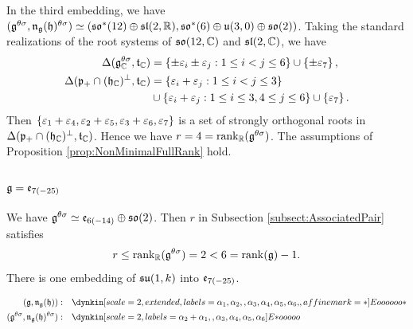 In the third embedding, we have $(\mathfrak{g}^{\theta\sigma}, \mathfrak{n}_{\mathfrak{g}}(\mathfrak{h})^{\theta\sigma}) \simeq (\mathfrak{so}^*(12) \oplus \mathfrak{sl}(2,\mathbb{R}), \mathfrak{so}^*(6) \oplus \mathfrak{u}(3, 0) \oplus\mathfrak{so}(2))$.
Taking the standard realizations of the root systems of $\mathfrak{so}(12,\mathbb{C})$ and $\mathfrak{sl}(2,\mathbb{C})$, we have
\begin{align*}
	\Delta(\mathfrak{g}_{\mathbb{C}}^{\theta\sigma}, \mathfrak{t}_{\mathbb{C}}) &= \left\{\pm \varepsilon_i \pm \varepsilon_j: 1\leq i < j \leq 6 \right\} \cup \left\{\pm \varepsilon_7 \right\}, \\
	\Delta(\mathfrak{p}_+ \cap (\mathfrak{h}_{\mathbb{C}})^\perp, \mathfrak{t}_{\mathbb{C}}) &= \left\{\varepsilon_i + \varepsilon_j: 1\leq i < j \leq 3 \right\} \\
	&\cup \left\{\varepsilon_i + \varepsilon_j: 1\leq i \leq 3, 4\leq j \leq 6 \right\} \cup \left\{\varepsilon_7 \right\}.
\end{align*}
Then $\left\{\varepsilon_1 + \varepsilon_4, \varepsilon_2 + \varepsilon_5, \varepsilon_3 + \varepsilon_6, \varepsilon_7 \right\}$ is a set of strongly orthogonal roots in $\Delta(\mathfrak{p}_+ \cap (\mathfrak{h}_{\mathbb{C}})^\perp, \mathfrak{t}_{\mathbb{C}})$.
Hence we have $r = 4 = \operatorname{rank}_{\mathbb{R}}(\mathfrak{g}^{\theta\sigma})$.
The assumptions of Proposition \ref{prop:NonMinimalFullRank} hold.

\subsubsection{\texorpdfstring{$\mathfrak{g} = \mathfrak{e}_{7(-25)}$}{g=e7(-25)}}


We have $\mathfrak{g}^{\theta\sigma} \simeq \mathfrak{e}_{6(-14)} \oplus \mathfrak{so}(2)$.
Then $r$ in Subsection \ref{subsect:AssociatedPair} satisfies
\begin{align*}
	r \leq \operatorname{rank}_{\mathbb{R}}(\mathfrak{g}^{\theta\sigma}) = 2 < 6 = \operatorname{rank}(\mathfrak{g}) - 1.
\end{align*}
There is one embedding of $\mathfrak{su}(1, k)$ into $\mathfrak{e}_{7(-25)}$.

\begin{align*}
	(\lie{g}, \lieNorm_{\lie{g}}(\lie{h})): \quad & \dynkin[scale=2, extended, labels={\alpha_1, \alpha_2, , \alpha_3, \alpha_4, \alpha_5, \alpha_6, }, affine mark=*]{E}{oooooo*} \\
	(\lie{g}^{\theta\sigma}, \lieNorm_{\lie{g}}(\lie{h})^{\theta\sigma}): \quad & \dynkin[scale=2, labels={\alpha_2+\alpha_1, , \alpha_3, \alpha_4, \alpha_5, \alpha_6}]{E}{*ooooo}
\end{align*}


